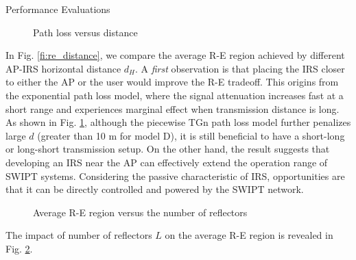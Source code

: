 \documentclass{IEEEtran}
\begin{document}
\begin{section}{Performance Evaluations}
	\begin{figure}
		\centering
		\begin{adjustbox}{width=\linewidth}
			
		\end{adjustbox}
		\caption{Path loss versus distance}
		\label{fi:path_loss}
	\end{figure}

	In Fig. \ref{fi:re_distance}, we compare the average R-E region achieved by different AP-IRS horizontal distance $d_H$. A \textit{first} observation is that placing the IRS closer to either the AP or the user would improve the R-E tradeoff. This origins from the exponential path loss model, where the signal attenuation increases fast at a short range and experiences marginal effect when transmission distance is long. As shown in Fig. \ref{fi:path_loss}, although the piecewise TGn path loss model further penalizes large $d$ (greater than 10 \si{\meter} for model D), it is still beneficial to have a short-long or long-short transmission setup. On the other hand, the result suggests that developing an IRS near the AP can effectively extend the operation range of SWIPT systems. Considering the passive characteristic of IRS, opportunities are that it can be directly controlled and powered by the SWIPT network.

	\begin{figure}
		\centering
		\begin{adjustbox}{width=\linewidth}
			
		\end{adjustbox}
		\caption{Average R-E region versus the number of reflectors}
		\label{fi:re_reflector}
	\end{figure}

	The impact of number of reflectors $L$ on the average R-E region is revealed in Fig. \ref{fi:re_reflector}.
\end{section}



\end{document}
